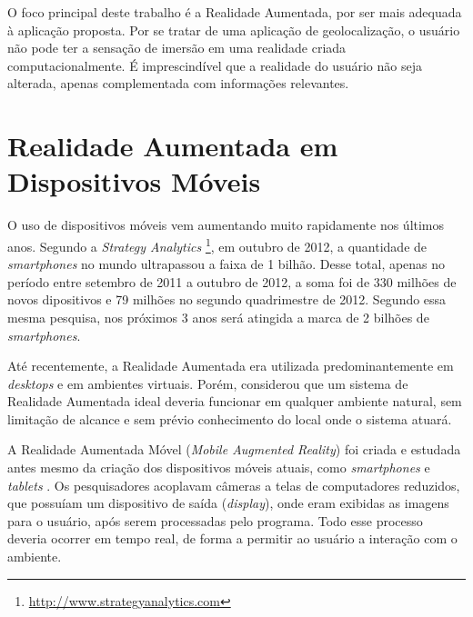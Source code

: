 O foco principal deste trabalho é a Realidade Aumentada, por ser mais adequada 
à aplicação proposta. Por se tratar de uma aplicação de geolocalização, o usuário
não pode ter a sensação de imersão em uma realidade criada computacionalmente. É
imprescindível que a realidade do usuário não seja alterada, apenas complementada 
com informações relevantes.






\section{Realidade Aumentada em Dispositivos Móveis}
\label{sec:ra_mobile}

O uso de dispositivos móveis vem aumentando muito rapidamente nos últimos anos.
Segundo a \textit{Strategy Analytics}
\footnote{\href{http://www.strategyanalytics.com}{http://www.strategyanalytics.com}},
em outubro de 2012, a quantidade de \textit{smartphones} no mundo ultrapassou a faixa
de 1 bilhão. Desse total, apenas no período entre setembro de 2011 a outubro de 2012, 
a soma foi de 330 milhões de novos dipositivos e 79 milhões no segundo quadrimestre de 2012.
Segundo essa mesma pesquisa, nos próximos 3 anos será atingida a marca de 2 bilhões de
\textit{smartphones}.


Até recentemente, a Realidade Aumentada era utilizada predominantemente 
em \textit{desktops} e em ambientes virtuais. Porém, \cite{SurveyAR}
considerou que um sistema de Realidade Aumentada ideal deveria 
funcionar em qualquer ambiente natural, sem limitação de alcance e sem prévio
conhecimento do local onde o sistema atuará.

A Realidade Aumentada Móvel (\textit{Mobile Augmented Reality}) foi criada e estudada
antes mesmo da criação dos dispositivos móveis atuais, como \textit{smartphones} e 
\textit{tablets} \cite{ExperiencesWithHandheldAR, HouseOfOlbrich}. Os pesquisadores acoplavam câmeras a
telas de computadores reduzidos, que possuíam um dispositivo de saída (\textit{display}),
onde eram exibidas as imagens para o usuário, após serem processadas pelo programa. 
Todo esse processo deveria ocorrer em tempo real, de forma a permitir ao usuário a interação
com o ambiente.



